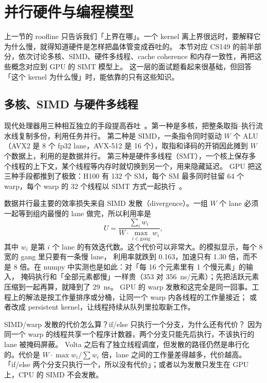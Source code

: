 \section{并行硬件与编程模型}
\label{sec:hw}

上一节的 roofline 只告诉我们「上界在哪」。一个 kernel 离上界很远时，要解释它为什么慢，就得知道硬件是怎样把晶体管变成吞吐的。
本节对应 CS149 的前半部分，依次讨论多核、SIMD、硬件多线程、cache coherence 和内存一致性，再把这些概念对应到 GPU 的 SIMT 模型上。
这一层的面试题看起来很基础，但回答「这个 kernel 为什么慢」时，能依靠的只有这些知识。

\subsection{多核、SIMD 与硬件多线程}

现代处理器用三种相互独立的手段提高吞吐~\cite{hennessy2019golden}。第一种是多核，把整条取指--执行流水线复制多份，利用任务并行。
第二种是 SIMD，一条指令同时驱动 $W$ 个 ALU（AVX2 是 8 个 fp32 lane，AVX-512 是 16 个），取指和译码的开销因此摊到 $W$ 个数据上，利用的是数据并行。
第三种是硬件多线程（SMT），一个核上保存多个线程的上下文，某个线程等内存时就切换到另一个，用来隐藏延迟。
GPU 把这三种手段都推到了极致：H100 有 132 个 SM，每个 SM 最多同时驻留 64 个 warp，每个 warp 的 32 个线程以 SIMT 方式一起执行~\cite{lindholm2008tesla,nickolls2008cuda}。

数据并行最主要的效率损失来自 SIMD 发散（divergence）。一组 $W$ 个 lane 必须一起等到组内最慢的 lane 做完，所以利用率是
\begin{equation}
U = \frac{\sum_{i} w_i}{W\cdot \max_{i\in\text{gang}} w_i},
\end{equation}
其中 $w_i$ 是第 $i$ 个 lane 的有效迭代数。这个代价可以非常大。的模拟显示，每个 8 宽的 gang 里只要有一条慢 lane，
利用率就跌到 0.163，加速只有 1.30 倍，而不是 8 倍。在 numpy 中实测也是如此：对「每 16 个元素里有 1 个慢元素」的输入，
掩码执行和「全部元素都慢」一样贵（353 对 356~ns/元素）；先把活跃元素压缩到一起再算，就降到了 29~ns。
GPU 的 warp 发散和这完全是同一回事。工程上的解法是按工作量排序或分桶，让同一个 warp 内各线程的工作量接近；
或者改成 persistent kernel，让线程持续从队列里拉取新工作。

\begin{qa}{SIMD/warp 发散的代价怎么算？if/else 只执行一个分支，为什么还有代价？}
\ans 因为同一个 warp 的线程共享一个程序计数器，两个分支只能先后执行，不该执行的 lane 被掩码屏蔽。
Volta 之后有了独立线程调度，但发散的路径仍然是串行化的。代价是 $W\cdot\max w_i/\sum w_i$ 倍，lane 之间的工作量差得越多，代价越高。
\wrong 「if/else 两个分支只执行一个，所以没有代价」；或者以为发散只发生在 GPU 上，CPU 的 SIMD 不会发散。
\end{qa}

